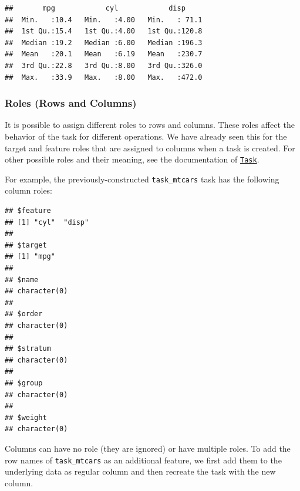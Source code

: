 \documentclass[
]{scrbook}
\newenvironment{Shaded}{\begin{snugshade}}{\end{snugshade}}
\newcommand{\AttributeTok}[1]{\textcolor[rgb]{0.77,0.63,0.00}{#1}}
\newcommand{\CommentTok}[1]{\textcolor[rgb]{0.56,0.35,0.01}{\textit{#1}}}
\newcommand{\ConstantTok}[1]{\textcolor[rgb]{0.00,0.00,0.00}{#1}}
\newcommand{\DecValTok}[1]{\textcolor[rgb]{0.00,0.00,0.81}{#1}}
\newcommand{\FunctionTok}[1]{\textcolor[rgb]{0.00,0.00,0.00}{#1}}
\newcommand{\NormalTok}[1]{#1}
\newcommand{\OtherTok}[1]{\textcolor[rgb]{0.56,0.35,0.01}{#1}}
\newcommand{\SpecialCharTok}[1]{\textcolor[rgb]{0.00,0.00,0.00}{#1}}
\newcommand{\StringTok}[1]{\textcolor[rgb]{0.31,0.60,0.02}{#1}}
\renewenvironment{Shaded} {\begin{snugshade}\small} {\end{snugshade}}
\begin{document}
\begin{verbatim}
##       mpg            cyl            disp      
##  Min.   :10.4   Min.   :4.00   Min.   : 71.1  
##  1st Qu.:15.4   1st Qu.:4.00   1st Qu.:120.8  
##  Median :19.2   Median :6.00   Median :196.3  
##  Mean   :20.1   Mean   :6.19   Mean   :230.7  
##  3rd Qu.:22.8   3rd Qu.:8.00   3rd Qu.:326.0  
##  Max.   :33.9   Max.   :8.00   Max.   :472.0
\end{verbatim}

\hypertarget{tasks-roles}{%
\subsubsection{Roles (Rows and Columns)}\label{tasks-roles}}

It is possible to assign different roles to rows and columns.
These roles affect the behavior of the task for different operations.
We have already seen this for the target and feature roles that are assigned to columns when a task is created.
For other possible roles and their meaning, see the documentation of \href{https://mlr3.mlr-org.com/reference/Task.html}{\texttt{Task}}.

For example, the previously-constructed \texttt{task\_mtcars} task has the following column roles:

\begin{Shaded}
\end{Shaded}

\begin{verbatim}
## $feature
## [1] "cyl"  "disp"
## 
## $target
## [1] "mpg"
## 
## $name
## character(0)
## 
## $order
## character(0)
## 
## $stratum
## character(0)
## 
## $group
## character(0)
## 
## $weight
## character(0)
\end{verbatim}

Columns can have no role (they are ignored) or have multiple roles.
To add the row names of \texttt{task\_mtcars} as an additional feature, we first add them to the underlying data as regular column and then recreate the task with the new column.

\begin{Shaded}
\end{Shaded}
\end{document}
